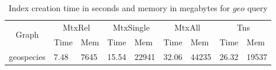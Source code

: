 


{\setlength{\tabcolsep}{0.25em}
	\begin{table}
		{
			\caption{Index creation time in seconds and memory in megabytes for $geo$ query}
			\label{tbl:index_creation_geo}
			\small
				\begin{tabular}{|c|l|l|l|l|l|l|l|l|}
					\hline
					\multirow{2}{*}{Graph}           & \multicolumn{2}{c|}{MtxRel} & \multicolumn{2}{c|}{MtxSingle} & \multicolumn{2}{c|}{MtxAll} & \multicolumn{2}{c|}{Tns} \\ \cline{2-9} 
					& Time         & Mem          & Time        & Mem        & Time           & Mem           & Time         & Mem          \\ \hline
					\multicolumn{1}{|l|}{geospecies} & 7.48         & 7645     & 15.54          & 22941 & 32.06        & 44235        & 26.32       & 19537                   \\ \hline
				\end{tabular}
		}
	\end{table}
}


